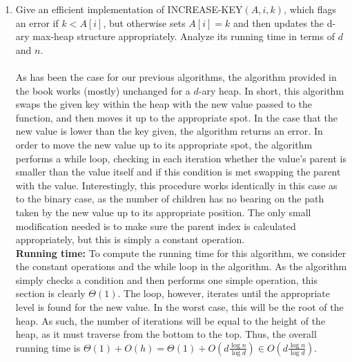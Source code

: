 \documentclass{article}
\begin{document}
\begin{enumerate}
\begin{enumerate}
\item Give an efficient implementation of INCREASE-KEY$(A,i,k)$, which flags an error if $k<A[i]$, but otherwise sets $A[i]=k$ and then updates the d-ary max-heap structure appropriately. Analyze its running time in terms of $d$ and $n$.
\\\\ As has been the case for our previous algorithms, the algorithm provided in the book works (mostly) unchanged for a $d$-ary heap. In short, this algorithm swaps the given key within the heap with the new value passed to the function, and then moves it up to the appropriate spot. In the case that the new value is lower than the key given, the algorithm returns an error. In order to move the new value up to its appropriate spot, the algorithm performs a while loop, checking in each iteration whether the value's parent is smaller than the value itself and if this condition is met swapping the parent with the value. Interestingly, this procedure works identically in this case as to the binary case, as the number of children has no bearing on the path taken by the new value up to its appropriate position. The only small modification needed is to make sure the parent index is calculated appropriately, but this is simply a constant operation.
\\ \textbf{Running time:}
To compute the running time for this algorithm, we consider the constant operations and the while loop in the algorithm. As the algorithm simply checks a condition and then performs one simple operation, this section is clearly $\Theta(1)$. The loop, however, iterates until the appropriate level is found for the new value. In the worst case, this will be the root of the heap. As such, the number of iterations will be equal to the height of the heap, as it must traverse from the bottom to the top. Thus, the overall running time is $\Theta
(1)+O(h)=\Theta(1)+O(d\frac{\log n}{\log d})\in O(d\frac{\log n}{\log d})$.
	\end{enumerate}
\end{enumerate}
	
\end{document}
